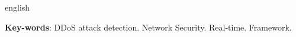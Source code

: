 \begin{resumo}[Abstract]
 \begin{otherlanguage*}{english}
 	
   \noindent 
   \textbf{Key-words}: DDoS attack detection. Network Security. Real-time. Framework.
 \end{otherlanguage*}
\end{resumo}